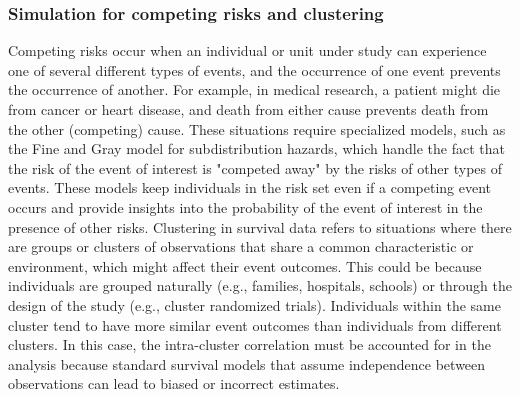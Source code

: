 \subsubsection{Simulation for competing risks and clustering}
Competing risks occur when an individual or unit under study can experience one of several different types of events, and the occurrence of one event prevents the occurrence of another. For example, in medical research, a patient might die from cancer or heart disease, and death from either cause prevents death from the other (competing) cause. These situations require specialized models, such as the Fine and Gray model \parencite{meng_simulating_2023} for subdistribution hazards, which handle the fact that the risk of the event of interest is "competed away" \parencite{meng_simulating_2023} by the risks of other types of events. These models keep individuals in the risk set even if a competing event occurs and provide insights into the probability of the event of interest in the presence of other risks. Clustering in survival data refers to situations where there are groups or clusters of observations that share a common characteristic or environment, which might affect their event outcomes. This could be because individuals are grouped naturally (e.g., families, hospitals, schools) or through the design of the study (e.g., cluster randomized trials). Individuals within the same cluster tend to have more similar event outcomes than individuals from different clusters. In this case, the intra-cluster correlation must be accounted for in the analysis because standard survival models that assume independence between observations can lead to biased or incorrect estimates.
